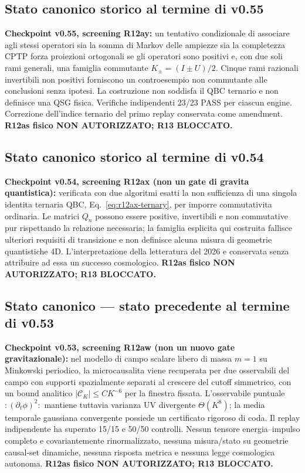 \documentclass[11pt,a4paper]{article}
\begin{document}
\subsection*{Stato canonico storico al termine di v0.55}
\textbf{Checkpoint v0.55, screening R12ay:} un tentativo condizionale di associare agli stessi operatori sia la somma di Markov delle ampiezze sia la completezza CPTP forza proiezioni ortogonali se gli operatori sono positivi e, con due soli rami generali, una famiglia commutante $K_\pm=(I\pm U)/2$. Cinque rami razionali invertibili non positivi forniscono un controesempio non commutante alle conclusioni senza ipotesi. La costruzione non soddisfa il QBC ternario e non definisce una QSG fisica. Verifiche indipendenti 23/23 PASS per ciascun engine. Correzione dell'indice ternario del primo replay conservata come amendment. \textbf{R12as fisico NON AUTORIZZATO; R13 BLOCCATO.}\par\medskip

\subsection*{Stato canonico storico al termine di v0.54}
\textbf{Checkpoint v0.54, screening R12ax (non un gate di gravita quantistica):}
verificata con due algoritmi esatti la non sufficienza di una singola identita ternaria QBC, Eq.~\eqref{eq:r12ax-ternary}, per imporre commutativita ordinaria. Le matrici $Q_n$ possono essere positive, invertibili e non commutative pur rispettando la relazione necessaria; la famiglia esplicita qui costruita fallisce ulteriori requisiti di transizione e non definisce alcuna misura di geometrie quantistiche 4D. L'interpretazione della letteratura del 2026 e conservata senza attribuire ad essa un successo cosmologico. \textbf{R12as fisico NON AUTORIZZATO; R13 BLOCCATO.}\par\medskip

\subsection*{Stato canonico — stato precedente al termine di v0.53}
\textbf{Checkpoint v0.53, screening R12aw (non un nuovo gate gravitazionale):}
nel modello di campo scalare libero di massa $m=1$ su Minkowski periodico, la microcausalita viene recuperata per due osservabili del campo con supporti spazialmente separati al crescere del cutoff simmetrico, con un bound analitico $|\mathcal C_K|\le C K^{-6}$ per la finestra fissata. L'osservabile puntuale $:\!(\partial_t\phi)^2\!:$ mantiene tuttavia varianza UV divergente $\Theta(K^8)$; la media temporale gaussiana convergente possiede un certificato rigoroso di coda. Il replay indipendente ha superato 15/15 e 50/50 controlli. Nessun tensore energia--impulso completo e covariantemente rinormalizzato, nessuna misura/stato su geometrie causal-set dinamiche, nessuna risposta metrica e nessuna legge cosmologica autonoma. \textbf{R12as fisico NON AUTORIZZATO; R13 BLOCCATO.}\par\medskip
\end{document}
